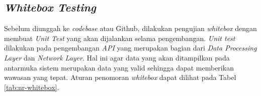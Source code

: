 % 





% 

\newpage

\subsection{\textit{Whitebox Testing}}

Sebelum diunggah ke \textit{codebase} atau Github, dilakukan pengujian \textit{whitebox} dengan membuat \textit{Unit Test} yang akan dijalankan selama pengembangan. \textit{Unit test} dilakukan pada pengembangan \textit{API} yang merupakan bagian dari \textit{Data Processing Layer} dan \textit{Network Layer}. Hal ini agar data yang akan ditampilkan pada antarmuka sistem merupakan data yang valid sehingga dapat memberikan wawasan yang tepat. Aturan penomoran \textit{whitebox} dapat dilihat pada Tabel \ref{tab:nr-whitebox}.

